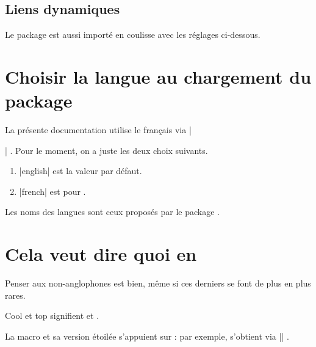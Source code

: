 
\subsection{Liens dynamiques}

Le package  est aussi importé en coulisse avec les réglages ci-dessous.

\begin{bdoclatex}[code]
\hypersetup{
  colorlinks,
  citecolor = orange!75!black,
  filecolor = orange!75!black,
  linkcolor = orange!75!black,
  urlcolor  = orange!75!black
}
\end{bdoclatex}


\section{Choisir la langue au chargement du package}

La présente documentation utilise le français via \bdocinlatex|\usepackage[lang = french]{bdoc}| .
Pour le moment, on a juste les deux choix suivants.

\begin{enumerate}
    \item \bdocinlatex|english| est la valeur par défaut.

    \item \bdocinlatex|french| est pour .
\end{enumerate}


\begin{bdocnote}
	Les noms des langues sont ceux proposés par le package .
\end{bdocnote}


\section{Cela veut dire quoi en }

Penser aux non-anglophones est bien, même si ces derniers se font de plus en plus rares.

\begin{bdoclatex}
Cool et top signifient  et .
\end{bdoclatex}


La macro  et sa version étoilée s'appuient sur  : par exemple,  s'obtient via \bdocinlatex|| .


